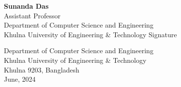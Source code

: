 \documentclass[12pt]{article}
\begin{document}
\begin{titlepage}
\begin{center}
{\begin{flushleft}
     \hspace*{0.8in} %
    {\fontsize{12}{1.5}\selectfont \textbf{Sunanda Das}}\\
    \hspace*{0.8in} %
    {\fontsize{12}{1.5}\selectfont Assistant Professor}\\
    \hspace*{0.8in} %
    {\fontsize{12}{1.5}\selectfont Department of Computer Science and Engineering \hspace{.65in}}\\
    \hspace*{0.8in} %
    {\fontsize{12}{1.5}\selectfont Khulna University of Engineering \& Technology \hspace{1in} Signature}\\
    \end{flushleft}
    \vspace{12pt}
    \vspace{12pt}
    \vspace{12pt}
    \vspace{12pt}
    \vspace{12pt}
    \vspace{12pt}
    \vspace{12pt}
    \vspace{12pt}
    \vspace{12pt}

    {\fontsize{12}{1.5}\selectfont Department of Computer Science and Engineering}\\
    \vspace{12pt}
    {\fontsize{12}{1.5}\selectfont Khulna University of Engineering \& Technology}\\
    \vspace{12pt}
    {\fontsize{12}{1.5}\selectfont Khulna 9203, Bangladesh}\\
    \vspace{12pt}
    {\fontsize{12}{1.5} June, 2024}\\
    \clearpage
    
}
\end{center}
\end{titlepage}
\end{document}
